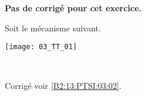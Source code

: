 \normaltrue
\correctionfalse



\setcounter{question}{0}
\ifcorrection
\else
\textbf{Pas de corrigé pour cet exercice.}
\fi

\ifprof
\else
Soit le mécanisme suivant. 
\begin{center}
\texttt{[image: 03\_TT\_01]}
\end{center}
\fi

\ifprof~\\ 

\else
\fi

\ifprof
\else
\footnotesize

\normalsize

\begin{flushright}
\footnotesize{Corrigé  voir \ref{B2:13:PTSI:03:02}.}
\end{flushright}%
\fi


